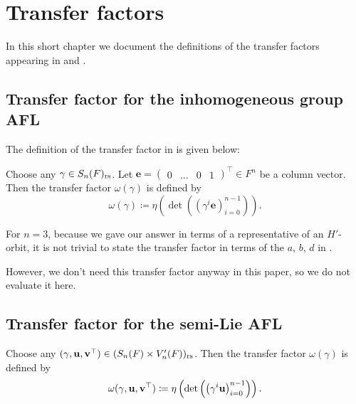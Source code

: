 \chapter{Transfer factors}
\label{ch:transf}

In this short chapter we document the definitions of the transfer
factors appearing in  and .

\section{Transfer factor for the inhomogeneous group AFL}
The definition of the transfer factor in  is given below:
\begin{definition}
  Choose any $\gamma \in S_n(F)_{\mathrm{rs}}$.
  Let $\mathbf{e} = \begin{pmatrix} 0 & \dots & 0 & 1 \end{pmatrix}^\top \in F^n$
  be a column vector.
  Then the transfer factor $\omega(\gamma)$ is defined by
  \[ \omega(\gamma) \coloneqq
    \eta\left( \det\left( \left( \gamma^i \mathbf{e} \right)_{i=0}^{n-1} \right) \right).
  \]
\end{definition}

For $n=3$, because we gave our answer in terms of a representative
of an $H'$-orbit, it is not trivial to state the transfer factor
in terms of the $a$, $b$, $d$ in .

However, we don't need this transfer factor anyway in this paper,
so we do not evaluate it here.

\section{Transfer factor for the semi-Lie AFL}
\begin{definition}
  Choose any ${(\gamma, \mathbf u, \mathbf v^\top)} \in (S_n(F) \times V_n'(F))_{\mathrm{rs}}$.
  Then the transfer factor $\omega(\gamma)$ is defined by
  \[ \omega{(\gamma, \mathbf u, \mathbf v^\top)} \coloneqq
    \eta\left( \det\left( \left( \gamma^i \mathbf u \right)_{i=0}^{n-1} \right) \right).
  \]
\end{definition}

